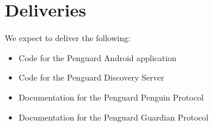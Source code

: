 \documentclass{report}
\begin{document}

\section{Deliveries}

We expect to deliver the following:

\begin{itemize}
    \item Code for the Penguard Android application
    \item Code for the Penguard Discovery Server
    \item Documentation for the Penguard Penguin Protocol
    \item Documentation for the Penguard Guardian Protocol
\end{itemize}
\end{document}
